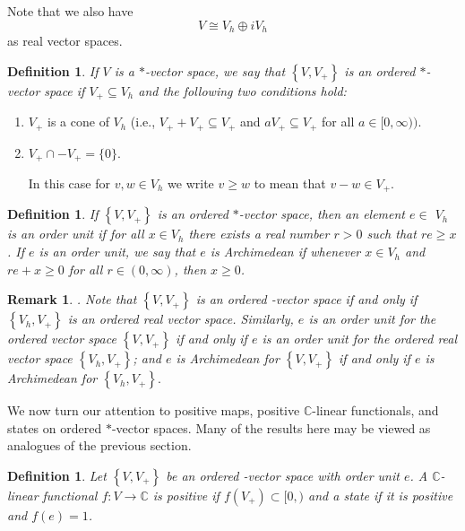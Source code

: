 \documentclass[aps,preprint]{revtex4}%
\newtheorem{definition}[theorem]{Definition}
\newtheorem{remark}[theorem]{Remark}
\begin{document}
Note that we also have
\begin{equation}
V\cong V_{h}\oplus iV_{h}%
\end{equation}
as real vector spaces.

\begin{definition}
If $V$ is a $\ast$-vector space, we say that $\left\{  V,V_{+}\right\}  $ is
an ordered $\ast$-vector space if $V_{+}\subseteq V_{h}$ and the following two
conditions hold:
\end{definition}

\begin{enumerate}
\item $V_{+}$ is a cone of $V_{h}$ (i.e., $V_{+}+V_{+}\subseteq V_{+}$ and
$aV_{+}\subseteq V_{+}$ for all $a\in\lbrack0,\infty))$.

\item $V_{+}\cap-V_{+}=\{0\}$.

In this case for $v,w\in V_{h}$ we write $v\geq w$ to mean that $v-w\in V_{+}$.
\end{enumerate}

\begin{definition}
If $\left\{  V,V_{+}\right\}  $ is an ordered $\ast$-vector space, then an
element $e\in$ $V_{h}$ is an order unit if for all $x\in V_{h}$ there exists a
real number $r>0$ such that $re\geq x$. If $e$ is an order unit, we say that
$e$ is Archimedean if whenever $x\in V_{h}$ and $re+x\geq0$ for all
$r\in(0,\infty)$, then $x\geq0$.
\end{definition}

\begin{remark}
. Note that $\left\{  V,V_{+}\right\}  $ is an ordered -vector space if and
only if $\left\{  V_{h},V_{+}\right\}  $ is an ordered real vector space.
Similarly, $e$ is an order unit for the ordered vector space $\left\{
V,V_{+}\right\}  $ if and only if $e$ is an order unit for the ordered real
vector space $\left\{  V_{h},V_{+}\right\}  $; and $e$ is Archimedean for
$\left\{  V,V_{+}\right\}  $ if and only if $e$ is Archimedean for $\left\{
V_{h},V_{+}\right\}  .$  
\end{remark}

We now turn our attention to positive maps, positive $\mathbb{C}$-linear
functionals, and states on ordered $\ast$-vector spaces. Many of the results
here may be viewed as analogues of the previous section.

\begin{definition}
Let $\left\{  V,V_{+}\right\}  $ be an ordered -vector space with order unit
$e$. A $\mathbb{C}$-linear functional $f:V\rightarrow\mathbb{C}$ is positive
if $f(V_{+})\subset\lbrack0,)$ and a state if it is positive and $f(e)=1$.
\end{definition}
\end{document}
